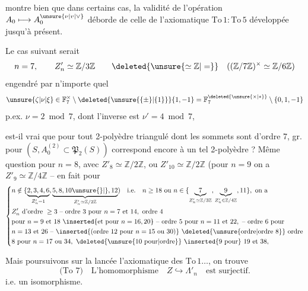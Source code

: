 
montre bien que dans certains cas, la validité de l'opération $A_0\longmapsto A_0^{\unsure{\nu|v|\vee}}$ déborde de celle de l'axiomatique $\mathrm{To}\,1:\mathrm{To}\,5$ développée jusqu'à présent.

Le cas suivant serait
\[
 n=7,\qquad Z'_n\simeq\mathbb Z/3\mathbb Z
 \qquad \deleted{\unsure{\simeq\mathbb Z|=}}\quad
 ((\mathbb Z/7\mathbb Z)^\times\simeq\mathbb Z/6\mathbb Z)
\]
engendré par n'importe quel
\[
 \unsure{\zeta|\nu|\xi}\in\mathbb F_7^\times\setminus\deleted{\unsure{\{\pm\}|\{1\}}}\{1,-1\}
 =\mathbb F_7^{\deleted{\unsure{\times|*}}}\setminus\{0,1,-1\}
\]
p.ex. $\nu=2\bmod 7$, dont l'inverse est $\nu'=4\bmod 7$,

est-il vrai que pour tout 2-polyèdre  triangulé  dont les sommets sont  d'ordre 7,   gr. pour $(S,A_0^{(2)}\subset\mathfrak P_2(S))$ correspond encore à un tel 2-polyèdre ? Même question pour $n=8$, avec $Z'_8\simeq\mathbb Z/2\mathbb Z$, ou  $Z'_{10}\simeq\mathbb Z/2\mathbb Z$ (pour $n=9$ on a $Z'_9\simeq\mathbb Z/4\mathbb Z$ -- en fait pour
\[
\left\{\begin{aligned}
&n\notin\{\underbrace{2,3,4,6}_{Z'_n=1},
 \underbrace{5,8,10\unsure{\}|{}},12}_{Z'_n\simeq\mathbb Z/2\mathbb Z})
 \quad\text{i.e.}\quad n\geq18\ \text{ou}\ n\in\{
 \underbrace{7}_{Z'_n\simeq\mathbb Z/3\mathbb Z},
 \underbrace{9}_{Z'_n\in\mathbb Z/4\mathbb Z},11\},\ \text{on a}\\
&Z'_n\ \text{d'ordre}\ \geq3\ \text{-- ordre 3 pour}\ n=7\ \text{et }14,\ \text{ordre }4\\
&\text{pour }n=9\ \text{et }18\ \inserted{\text{et pour }n=16,20}\ \text{-- ordre 5 pour }n=11\ \text{et }22,\ \text{-- ordre 6 pour}\\
&n=13\ \text{et }26\ \text{-- }\inserted{\text{(ordre 12 pour }n=15\ \text{ou }30\text{)}}\
  \deleted{\text{\unsure{ordre|ordre 8}}}\ \text{ordre}\\
&8\ \text{pour }n=17\ \text{ou }34,\ \deleted{\text{\unsure{10 pour|ordre}}}\
 \inserted{\text{9 pour}}\ 19\ \text{et }38,
\end{aligned}\right.
\]

Mais poursuivons sur la lancée  l'axiomatique des $\mathrm{To}\,1\ldots$, on trouve
\[
 \text{(To 7)}\quad \text{L'homomorphisme}\quad Z\hookrightarrow\Lambda'_n\quad\text{est surjectif.}\tag*{(38)}
\]
i.e. un isomorphisme.

